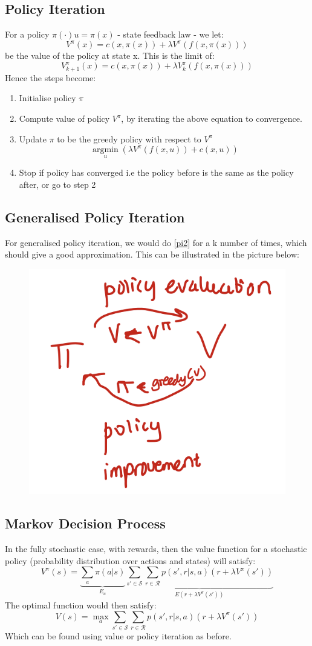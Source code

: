 \documentclass{article}
\begin{document}
\subsection{Policy Iteration}
For a policy $\pi ( \cdot) u = \pi(x)$ - state feedback law - we let:
\[
V^\pi(x) = c(x,\pi(x)) + \lambda V^\pi(f(x,\pi(x)))
\]
be the value of the policy at state x. This is the limit of:
\[
V_{k+1}^\pi(x) = c(x,\pi(x)) + \lambda V_k^\pi(f(x,\pi(x)))
\]
Hence the steps become:
\begin{enumerate}
    \item Initialise policy $\pi$
    \item \label{pi2} Compute value of policy $V^\pi$, by iterating the above equation to convergence.
    \item Update $\pi$ to be the greedy policy with respect to $V^\pi$
    \[
    \mathop{\arg \min}\limits_{u} \left( \lambda V^\pi (f(x,u)) + c(x,u) \right)
    \]
    \item Stop if policy has converged i.e the policy before is the same as the policy after, or go to step 2
\end{enumerate}
\subsection{Generalised Policy Iteration}
For generalised policy iteration, we would do \eqref{pi2} for a k number of times, which should give a good approximation. This can be illustrated in the picture below:
\begin{figure}[H]
    \centering
    \includegraphics[width=0.2\linewidth]{Screenshot 2023-03-06 at 11.31.16.png}
\end{figure}
\subsection{Markov Decision Process}
In the fully stochastic case, with rewards, then the value function for a stochastic policy (probability distribution over actions and states) will satisfy:
\[
V^\pi(s) = \underbrace{\sum_a \pi (a|s)}_{E_a} \underbrace{\sum_{s' \in \mathcal{S}} \sum_{r \in \mathcal{R}} p(s', r|s,a)(r + \lambda V^\pi(s'))}_{E(r + \lambda V^\pi (s'))}
\]
The optimal function would then satisfy:
\[
V(s) = \max_a \sum_{s' \in \mathcal{S}} \sum_{r \in \mathcal{R}} p(s', r|s,a)(r + \lambda V^\pi(s'))
\]
Which can be found using value or policy iteration as before.
\end{document}
